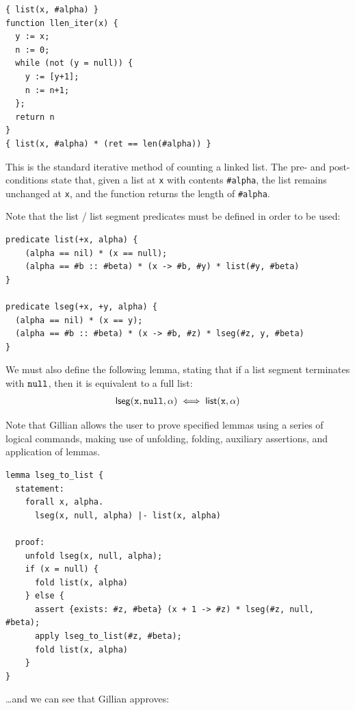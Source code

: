 \begin{lstlisting}[numbers=none, caption={Verification example - list length in WISL}, style=code]
{ list(x, #alpha) }
function llen_iter(x) {
  y := x;
  n := 0;
  while (not (y = null)) {
    y := [y+1];
    n := n+1;
  };
  return n
}
{ list(x, #alpha) * (ret == len(#alpha)) }
\end{lstlisting}

This is the standard iterative method of counting a linked list. The pre- and
post-conditions state that, given a list at \texttt{x} with contents
\texttt{\#alpha}, the list remains unchanged at \texttt{x}, and the function
returns the length of \texttt{\#alpha}.

Note that the list / list segment predicates must be defined in order to be used:

\begin{lstlisting}[caption={List predicates in WISL\label{lst:list-predicate}}, style=code, numbers=none]
predicate list(+x, alpha) {
    (alpha == nil) * (x == null);
    (alpha == #b :: #beta) * (x -> #b, #y) * list(#y, #beta)
}

predicate lseg(+x, +y, alpha) {
  (alpha == nil) * (x == y);
  (alpha == #b :: #beta) * (x -> #b, #z) * lseg(#z, y, #beta)
}
\end{lstlisting}

We must also define the following lemma, stating that if a list segment
terminates with $\mathtt{null}$, then it is equivalent to a full list:
\begin{align*}
  \mathsf{lseg}(\mathtt{x}, \mathtt{null}, \alpha) \iff \mathsf{list}(\mathtt{x}, \alpha)
\end{align*}

Note that Gillian allows the user to prove specified lemmas using a series of
logical commands, making use of unfolding, folding, auxiliary assertions, and
application of lemmas.

\begin{lstlisting}[caption={List lemma in WISL}, style=code, numbers=none]
lemma lseg_to_list {
  statement:
    forall x, alpha.
      lseg(x, null, alpha) |- list(x, alpha)

  proof:
    unfold lseg(x, null, alpha);
    if (x = null) {
      fold list(x, alpha)
    } else {
      assert {exists: #z, #beta} (x + 1 -> #z) * lseg(#z, null, #beta);
      apply lseg_to_list(#z, #beta);
      fold list(x, alpha)
    }
}
\end{lstlisting}

\ldots and we can see that Gillian approves:

